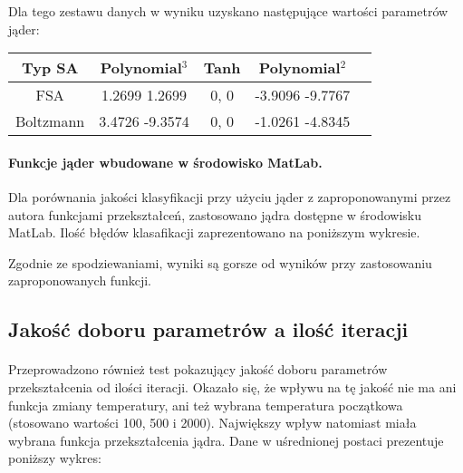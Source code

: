 \documentclass{article}
\begin{document}
Dla tego zestawu danych w wyniku uzyskano następujące wartości parametrów jąder:

\begin{center}
    \begin{tabular}{ | c | c | c | c | c | }
    \hline
    Typ SA & \textbf{Polynomial}$^{3}$ & \textbf{Tanh} & \textbf{Polynomial$^{2}$} \\ \hline
    FSA & 1.2699 1.2699 & 0, 0 & -3.9096 -9.7767 \\ \hline
	Boltzmann & 3.4726 -9.3574 & 0, 0 & -1.0261 -4.8345 \\ \hline
    \end{tabular}
\end{center}

\paragraph {Funkcje jąder wbudowane w środowisko MatLab.} Dla porównania jakości klasyfikacji przy użyciu jąder z zaproponowanymi przez autora funkcjami przekształceń, zastosowano jądra dostępne w środowisku MatLab. Ilość błędów klasafikacji zaprezentowano na poniższym wykresie.
\pgfplotsset{width=6cm,compat=1.4}
\begin{center}
\end{center}

Zgodnie ze spodziewaniami, wyniki są gorsze od wyników przy zastosowaniu zaproponowanych funkcji.

\subsection{Jakość doboru parametrów a ilość iteracji}
\paragraph{}
Przeprowadzono również test pokazujący jakość doboru parametrów przekształcenia od ilości iteracji. Okazało się, że wpływu na tę jakość nie ma ani funkcja zmiany temperatury, ani też wybrana temperatura początkowa (stosowano wartości 100, 500 i 2000). Największy wpływ natomiast miała wybrana funkcja przekształcenia jądra. Dane w uśrednionej postaci prezentuje poniższy wykres:
\end{document}

